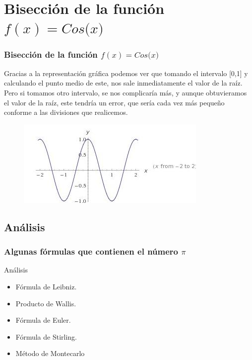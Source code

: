 \documentclass{beamer}
\begin{document}
\section{Bisección de la función $f(x)=Cos($\pi$x)$} 

\begin{frame}
\frametitle{Bisección de la función $f(x)=Cos($\pi$x)$}

\begin{block}{}
Gracias a la representación gráfica podemos ver que tomando el intervalo [0,1] y calculando el punto medio de este, nos sale inmediatamente el valor de la raíz. Pero si tomamos otro intervalo, se nos complicaría más, y aunque obtuvieramos el valor de la raíz, este tendría un error, que sería cada vez más pequeño conforme a las divisiones que realicemos.
\end{block}

\begin{figure}[b]
\begin{center}
\includegraphics[scale=0.4]{cos.jpeg}
\end{center}
\end{figure}

\end{frame}

\subsection{Análisis}
\begin{frame}
\frametitle{Algunas fórmulas que contienen el número $\pi$}
\begin{block}{Análisis}
\begin{itemize}
  \item Fórmula de Leibniz.
  \pause
  \item Producto de Wallis.
  \pause
  \item Fórmula de Euler.
  \pause
  \item Fórmula de Stirling.
  \pause
  \item Método de Montecarlo

\end{itemize}
\end{block}

\end{frame}
\end{document}
